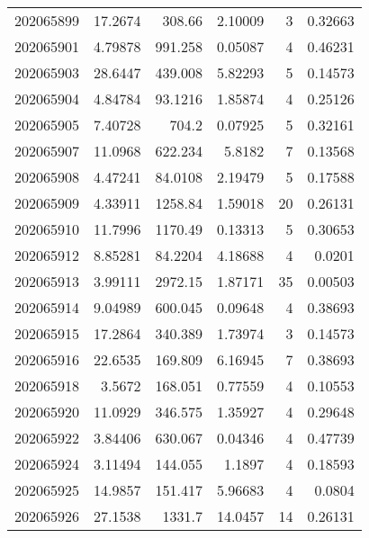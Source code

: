\begin{tabular}{rrrrrr}
 202065899 &         17.2674  &      308.66   &            2.10009 &           3 & 0.32663 \\
 202065901 &          4.79878 &      991.258  &            0.05087 &           4 & 0.46231 \\
 202065903 &         28.6447  &      439.008  &            5.82293 &           5 & 0.14573 \\
 202065904 &          4.84784 &       93.1216 &            1.85874 &           4 & 0.25126 \\
 202065905 &          7.40728 &      704.2    &            0.07925 &           5 & 0.32161 \\
 202065907 &         11.0968  &      622.234  &            5.8182  &           7 & 0.13568 \\
 202065908 &          4.47241 &       84.0108 &            2.19479 &           5 & 0.17588 \\
 202065909 &          4.33911 &     1258.84   &            1.59018 &          20 & 0.26131 \\
 202065910 &         11.7996  &     1170.49   &            0.13313 &           5 & 0.30653 \\
 202065912 &          8.85281 &       84.2204 &            4.18688 &           4 & 0.0201  \\
 202065913 &          3.99111 &     2972.15   &            1.87171 &          35 & 0.00503 \\
 202065914 &          9.04989 &      600.045  &            0.09648 &           4 & 0.38693 \\
 202065915 &         17.2864  &      340.389  &            1.73974 &           3 & 0.14573 \\
 202065916 &         22.6535  &      169.809  &            6.16945 &           7 & 0.38693 \\
 202065918 &          3.5672  &      168.051  &            0.77559 &           4 & 0.10553 \\
 202065920 &         11.0929  &      346.575  &            1.35927 &           4 & 0.29648 \\
 202065922 &          3.84406 &      630.067  &            0.04346 &           4 & 0.47739 \\
 202065924 &          3.11494 &      144.055  &            1.1897  &           4 & 0.18593 \\
 202065925 &         14.9857  &      151.417  &            5.96683 &           4 & 0.0804  \\
 202065926 &         27.1538  &     1331.7    &           14.0457  &          14 & 0.26131 \\

\end{tabular}
